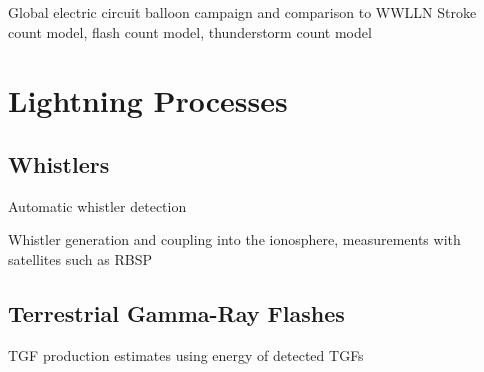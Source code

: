 Global electric circuit balloon campaign and comparison to WWLLN
  Stroke count model, flash count model, thunderstorm count model

\section{Lightning Processes}

\subsection{Whistlers}

  Automatic whistler detection

Whistler generation and coupling into the ionosphere, measurements with satellites such as RBSP

\subsection{Terrestrial Gamma-Ray Flashes}

 TGF production estimates using energy of detected TGFs





